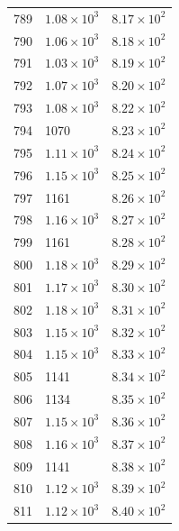 \begin{table}[H]
\begin{tabular}{lll}
789 & $\displaystyle 1.08 \times 10^{3}$ & $\displaystyle 8.17 \times 10^{2}$ \\
790 & $\displaystyle 1.06 \times 10^{3}$ & $\displaystyle 8.18 \times 10^{2}$ \\
791 & $\displaystyle 1.03 \times 10^{3}$ & $\displaystyle 8.19 \times 10^{2}$ \\
792 & $\displaystyle 1.07 \times 10^{3}$ & $\displaystyle 8.20 \times 10^{2}$ \\
793 & $\displaystyle 1.08 \times 10^{3}$ & $\displaystyle 8.22 \times 10^{2}$ \\
794 & 1070 & $\displaystyle 8.23 \times 10^{2}$ \\
795 & $\displaystyle 1.11 \times 10^{3}$ & $\displaystyle 8.24 \times 10^{2}$ \\
796 & $\displaystyle 1.15 \times 10^{3}$ & $\displaystyle 8.25 \times 10^{2}$ \\
797 & 1161 & $\displaystyle 8.26 \times 10^{2}$ \\
798 & $\displaystyle 1.16 \times 10^{3}$ & $\displaystyle 8.27 \times 10^{2}$ \\
799 & 1161 & $\displaystyle 8.28 \times 10^{2}$ \\
800 & $\displaystyle 1.18 \times 10^{3}$ & $\displaystyle 8.29 \times 10^{2}$ \\
801 & $\displaystyle 1.17 \times 10^{3}$ & $\displaystyle 8.30 \times 10^{2}$ \\
802 & $\displaystyle 1.18 \times 10^{3}$ & $\displaystyle 8.31 \times 10^{2}$ \\
803 & $\displaystyle 1.15 \times 10^{3}$ & $\displaystyle 8.32 \times 10^{2}$ \\
804 & $\displaystyle 1.15 \times 10^{3}$ & $\displaystyle 8.33 \times 10^{2}$ \\
805 & 1141 & $\displaystyle 8.34 \times 10^{2}$ \\
806 & 1134 & $\displaystyle 8.35 \times 10^{2}$ \\
807 & $\displaystyle 1.15 \times 10^{3}$ & $\displaystyle 8.36 \times 10^{2}$ \\
808 & $\displaystyle 1.16 \times 10^{3}$ & $\displaystyle 8.37 \times 10^{2}$ \\
809 & 1141 & $\displaystyle 8.38 \times 10^{2}$ \\
810 & $\displaystyle 1.12 \times 10^{3}$ & $\displaystyle 8.39 \times 10^{2}$ \\
811 & $\displaystyle 1.12 \times 10^{3}$ & $\displaystyle 8.40 \times 10^{2}$ \\

\end{tabular}
\end{table}
